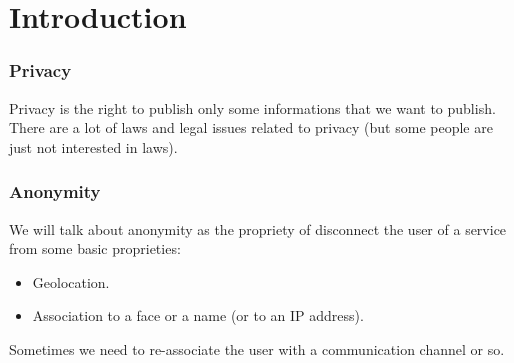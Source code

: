 \section{Introduction}

\begin{frame}
	\frametitle {Privacy}
	Privacy is the right to publish only some informations that we want to
	publish.\\

	There are a lot of laws and legal issues related to privacy (but some
	people are just not interested in laws).
\end{frame}

\begin{frame}
	\frametitle {Anonymity}
	We will talk about anonymity as the propriety of disconnect the user of a
	service from some basic proprieties:
	\begin{itemize}
		\item Geolocation.
		\item Association to a face or a name (or to an IP address).
	\end{itemize}

	Sometimes we need to re-associate the user with a communication
	channel or so.
\end{frame}
